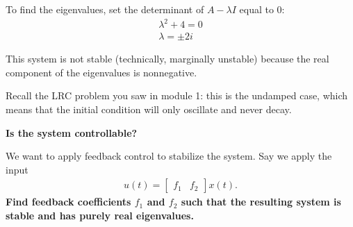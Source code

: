 \begin{enumerate}
{        To find the eigenvalues, set the determinant of $A - \lambda I$ equal to $0$:
        \begin{align*}
            \lambda^2 + 4 = 0 \\
            \lambda = \pm 2i
        \end{align*}

        This system is not stable (technically, marginally unstable) because the real component of the eigenvalues is nonnegative. 

        Recall the LRC problem you saw in module 1: this is the undamped case, which means that the initial condition will only oscillate and never decay.
    }

    \qitem \textbf{Is the system controllable?}


    \qitem We want to apply feedback control to stabilize the system. Say we apply the input
    \begin{align*}
        u(t) = \begin{bmatrix} f_1 & f_2\end{bmatrix} x(t).
    \end{align*}
\textbf{Find feedback coefficients $f_1$ and $f_2$ such that the resulting system is stable and has purely real eigenvalues.}


\end{enumerate}
